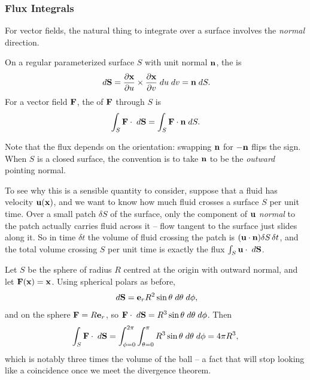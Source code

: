 \documentclass[a4paper]{scrartcl}
\begin{document}
\subsubsection{Flux Integrals}

For vector fields, the natural thing to integrate over a surface involves the \emph{normal} direction.

\begin{definition}
	On a regular parameterized surface $S$ with unit normal $\mathbf{n}$, the  is
	$$
	\; d \mathbf{S} = \frac{\partial \mathbf{x}}{\partial u} \times \frac{\partial \mathbf{x}}{\partial v} \; d u \; d v = \mathbf{n} \; d S.
	$$
	For a vector field $\mathbf{F}$, the  of $\mathbf{F}$ through $S$ is
	$$
	\int_S \mathbf{F} \cdot \; d \mathbf{S} = \int_S \mathbf{F} \cdot \mathbf{n} \; d S.
	$$
\end{definition}

Note that the flux depends on the orientation: swapping $\mathbf{n}$ for $-\mathbf{n}$ flips the sign. When $S$ is a closed surface, the convention is to take $\mathbf{n}$ to be the \emph{outward} pointing normal.

To see why this is a sensible quantity to consider, suppose that a fluid has velocity $\mathbf{u}(\mathbf{x})$, and we want to know how much fluid crosses a surface $S$ per unit time. Over a small patch $\delta S$ of the surface, only the component of $\mathbf{u}$ \emph{normal} to the patch actually carries fluid across it -- flow tangent to the surface just slides along it. So in time $\delta t$ the volume of fluid crossing the patch is $(\mathbf{u} \cdot \mathbf{n}) \delta S \, \delta t$, and the total volume crossing $S$ per unit time is exactly the flux $\int_S \mathbf{u} \cdot \; d \mathbf{S}$.

\begin{center}
\end{center}

\begin{example}
	Let $S$ be the sphere of radius $R$ centred at the origin with outward normal, and let $\mathbf{F}(\mathbf{x}) = \mathbf{x}$. Using spherical polars as before,
	$$
	\; d \mathbf{S} = \mathbf{e}_r R^2 \sin \theta \; d \theta \; d \phi,
	$$
	and on the sphere $\mathbf{F} = R \mathbf{e}_r$, so $\mathbf{F} \cdot \; d \mathbf{S} = R^3 \sin \theta \; d \theta \; d \phi$. Then
	$$
	\int_S \mathbf{F} \cdot \; d \mathbf{S} = \int_{\phi = 0}^{2\pi} \int_{\theta = 0}^{\pi} R^3 \sin \theta \; d \theta \; d \phi = 4 \pi R^3,
	$$
	which is notably three times the volume of the ball -- a fact that will stop looking like a coincidence once we meet the divergence theorem.
\end{example}
\end{document}

